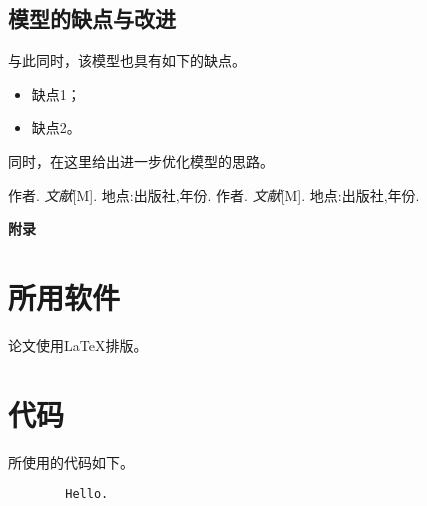 \documentclass[12pt, a4paper, oneside, utf8]{ctexart}
\renewcommand{\thesection}{\zhnum{section}}
\begin{document}
    \subsection{模型的缺点与改进}

    与此同时，该模型也具有如下的缺点。
    \begin{itemize}
        \item 缺点1；
        \item 缺点2。
    \end{itemize}
    同时，在这里给出进一步优化模型的思路。

    \begin{thebibliography}{99}
        作者. \emph{文献}[M]. 地点:出版社,年份.
        作者. \emph{文献}[M]. 地点:出版社,年份.
    \end{thebibliography}

    \begin{center}
        \Large{\textbf{附录}}
    \end{center}

    \begin{appendices}
        \renewcommand{\thesection}{\Alph{section}}
        \section{所用软件}
        论文使用\LaTeX 排版。
        \section{代码}
        所使用的代码如下。
        \begin{lstlisting}
		Hello.
        \end{lstlisting}
    \end{appendices}
\end{document}
